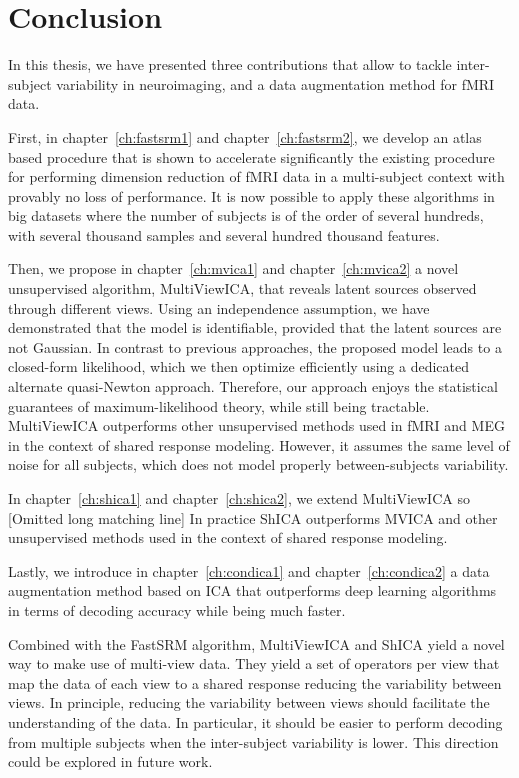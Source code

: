 \documentclass[ twoside,openright,titlepage,numbers=noenddot,%
                headinclude,footinclude,cleardoublepage=empty,abstract=on,
                BCOR=5mm,paper=a4,fontsize=11pt, 
                ]{scrreprt}
\begin{document}
\chapter{Conclusion}
In this thesis, we have presented three contributions that allow to tackle
inter-subject variability in neuroimaging, and a data augmentation method for fMRI data.

First, in chapter~\ref{ch:fastsrm1} and chapter~\ref{ch:fastsrm2}, we develop an
atlas based procedure that is shown to accelerate significantly the existing
procedure for performing dimension reduction of fMRI data in a multi-subject
context with provably no loss of performance. It is now possible to apply these
algorithms in big datasets where the number of subjects is of the order of
several hundreds, with several thousand samples and several hundred thousand features.

Then, we propose in chapter~\ref{ch:mvica1} and chapter~\ref{ch:mvica2}
a novel unsupervised algorithm, MultiViewICA, that reveals latent sources observed through different views. Using an independence assumption, we have demonstrated that the model is identifiable, provided that the latent
sources are not Gaussian. In contrast to previous approaches, the proposed model leads to a closed-form likelihood, which we then optimize efficiently using a dedicated alternate quasi-Newton approach.
Therefore, our approach enjoys the statistical guarantees of maximum-likelihood
theory, while still being tractable. MultiViewICA outperforms other unsupervised
methods used in fMRI and MEG in the context of shared response modeling. However,
it assumes the same level of noise for all
subjects, which does not model properly between-subjects variability.

In chapter~\ref{ch:shica1} and chapter~\ref{ch:shica2}, we extend MultiViewICA so
[Omitted long matching line]
In practice ShICA outperforms MVICA and other unsupervised methods used in the
context of shared response modeling.

Lastly, we introduce in chapter~\ref{ch:condica1} and chapter~\ref{ch:condica2} a data
augmentation method based on ICA that outperforms deep learning algorithms in
terms of decoding accuracy while being much faster.

Combined with the FastSRM algorithm, MultiViewICA and ShICA yield a novel way to
make use of multi-view data. They yield a set of operators per view that map
the data of each view to a shared response reducing the variability between views.
In principle, reducing the variability between views should facilitate the
understanding of the data. In particular, it should be easier to perform
decoding from multiple subjects when the inter-subject variability is lower.
This direction could be explored in future work.
\end{document}
